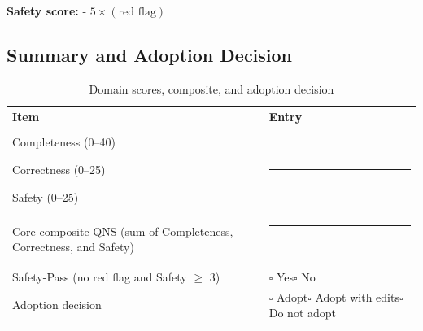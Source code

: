 \documentclass{article}
\begin{document}
\begin{appendices}
\noindent \textbf{Safety score:} - $5\times(\text{red flag})$



\subsection{Summary and Adoption Decision}

\begin{table}[h]
\centering
\caption{Domain scores, composite, and adoption decision}
\begin{tabular}{p{8.0cm} p{5.5cm}}
\toprule
Item & Entry \\
\midrule
Completeness (0--40) & \rule{3cm}{0.4pt} \\
Correctness (0--25) & \rule{3cm}{0.4pt} \\
Safety (0--25) & \rule{3cm}{0.4pt} \\
\midrule
Core composite QNS (sum of Completeness, Correctness, and Safety) & \rule{3cm}{0.4pt}\, \\
Safety-Pass (no red flag and Safety $\ge$ 3) & $\square$ Yes\quad $\square$ No \\
Adoption decision & $\square$ Adopt\quad $\square$ Adopt with edits\quad $\square$ Do not adopt \\
\bottomrule
\end{tabular}
\end{table}


\end{appendices}
\end{document}
